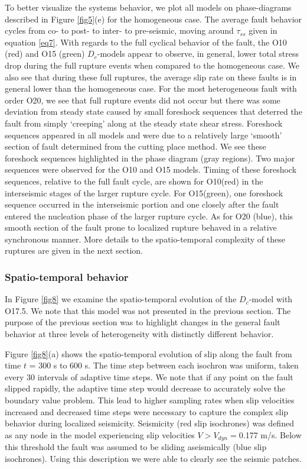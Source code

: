 \documentclass[final,3p, 11pt,authoryear]{elsarticle}
\begin{document}
To better visualize the systems behavior, we plot all models on phase-diagrams described in Figure \ref{fig5}(e) for the homogeneous case. The average fault behavior cycles from co- to post- to inter- to pre-seismic, moving around $\tau_{ss}$ given in equation \eqref{eq7}. With regards to the full cyclical behavior of the fault, the O10 (red) and O15 (green) $D_{c}$-models appear to observe, in general, lower total stress drop during the full rupture events when compared to the homogeneous case.  We also see that during these full ruptures, the average slip rate on these faults is in general lower than the homogeneous case.  For the most heterogeneous fault with order O20, we see that full rupture events did not occur but there was some deviation from steady state caused by small foreshock sequences that deterred the fault from simply `creeping' along at the steady state shear stress. Foreshock sequences appeared in all models and were due to a relatively large `smooth' section of fault determined from the cutting place method. We see these foreshock sequences highlighted in the phase diagram (gray regions). Two major sequences were observed for the O10 and O15 models. Timing of these foreshock sequences, relative to the full fault cycle, are shown for O10(red) in the interseismic stages of the larger rupture cycle. For O15(green), one foreshock sequence occurred in the interseismic portion and one closely after the fault entered the nucleation phase of the larger rupture cycle. As for O20 (blue), this smooth section of the fault prone to localized rupture behaved in a relative synchronous manner. More details to the spatio-temporal complexity of these ruptures are given in the next section. 

\subsubsection{Spatio-temporal behavior}
\label{spatialmodel}

In Figure \ref{fig8} we examine the spatio-temporal evolution of the $D_{c}$-model with O17.5. We note that this model was not presented in the previous section. The purpose of the previous section was to highlight changes in the general fault behavior at three levels of heterogeneity  with distinctly different behavior.

Figure \ref{fig8}(a) shows the spatio-temporal evolution of slip along the fault from time $t$ = 300 s to 600 s. The time step between each isochron was uniform, taken every 30 intervals of adaptive time steps.  We note that if any point on the fault slipped rapidly, the adaptive time step would decrease to accurately solve the boundary value problem. This lead to higher sampling rates when slip velocities increased and decreased time steps were necessary to capture the complex slip behavior during localized seismicity.  Seismicity (red slip isochrones) was defined as any node in the model experiencing slip velocities $V > V_{dyn}=$0.177 m/s. Below this threshold the fault was assumed to be sliding aseismically (blue slip isochrones). Using this description we were able to clearly see the seismic patches.
\end{document}
